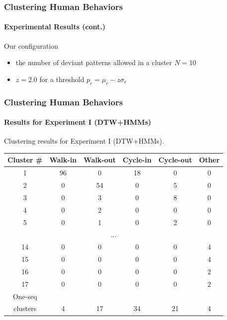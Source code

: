 
\begin{frame}
    \frametitle{Clustering Human Behaviors}
    \framesubtitle{Experimental Results (cont.)}
    
    Our configuration
    
    \begin{itemize}
        \item the number of deviant patterns allowed in a cluster $N = 10$
        \item $z = 2.0$ for a threshold $p_c = \mu_c - z\sigma_c$
    \end{itemize}

\end{frame}


\begin{frame}
    \frametitle{Clustering Human Behaviors}
    \framesubtitle{Results for Experiment I (DTW+HMMs)}
    
    \centering Clustering results for Experiment I (DTW+HMMs).
    
    \begin{table}
        \vspace{-0.1in}
        \centering
        \begin{tabular}{ | c | c | c | c | c | c | }
            \hline
            Cluster \# & Walk-in & Walk-out & Cycle-in & Cycle-out & Other \\ \hline
            1 & 96 & 0 & 18 & 0 & 0 \\ \hline
            2 & 0 & 54 & 0 & 5 & 0 \\ \hline
            3 & 0 & 3 & 0 & 8 & 0 \\ \hline
            4 & 0 & 2 & 0 & 0 & 0 \\ \hline
            5 & 0 & 1 & 0 & 2 & 0 \\ \hline
            \multicolumn{6}{c}{...} \\ \hline
            14 & 0 & 0 & 0 & 0 & 4 \\ \hline
            15 & 0 & 0 & 0 & 0 & 4 \\ \hline
            16 & 0 & 0 & 0 & 0 & 2 \\ \hline
            17 & 0 & 0 & 0 & 0 & 2 \\ \hline
            One-seq & & & & & \\
            clusters & 4 & 17 & 34 & 21 & 4 \\ \hline
        \end{tabular}
    \end{table}
    
\end{frame}

